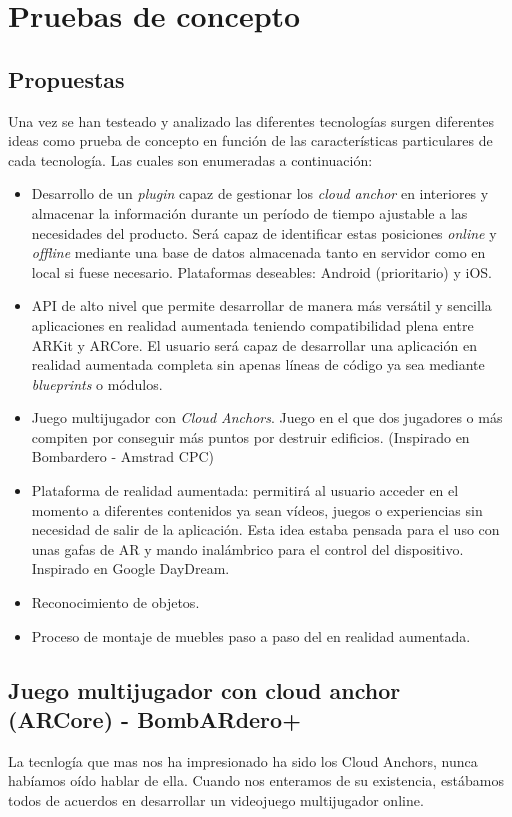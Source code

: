 \chapter{Pruebas de concepto}
\section{Propuestas}
Una vez se han testeado y analizado las diferentes tecnologías surgen diferentes ideas como prueba de concepto en función de las características particulares de cada tecnología. Las cuales son enumeradas a continuación:

\begin{itemize}
\item Desarrollo de un \textit{plugin} capaz de gestionar los \textit{cloud anchor} en interiores y almacenar la información durante un período de tiempo ajustable a las necesidades del producto. Será capaz de identificar estas posiciones \textit{online} y \textit{offline} mediante una base de datos almacenada tanto en servidor como en local si fuese necesario. Plataformas deseables: Android (prioritario) y iOS. 
\item API de alto nivel que permite desarrollar de manera más versátil y sencilla aplicaciones en realidad aumentada teniendo compatibilidad plena entre ARKit y ARCore. El usuario será capaz de desarrollar una aplicación en realidad aumentada completa sin apenas líneas de código ya sea mediante \textit{blueprints} o módulos.
\item Juego multijugador con \textit{Cloud Anchors}. Juego en el que dos jugadores o más compiten por conseguir más puntos por destruir edificios. (Inspirado en Bombardero - Amstrad CPC)
\item Plataforma de realidad aumentada: permitirá al usuario acceder en el momento a diferentes contenidos ya sean vídeos, juegos o experiencias sin necesidad de salir de la aplicación. Esta idea estaba pensada para el uso con unas gafas de AR y mando inalámbrico para el control del dispositivo. Inspirado en Google DayDream.
\item Reconocimiento de objetos.
\item Proceso de montaje de muebles paso a paso del en realidad aumentada.
\end{itemize}

\clearpage
\section{Juego multijugador con cloud anchor (ARCore) - BombARdero+}
La tecnlogía que mas nos ha impresionado ha sido los Cloud Anchors, nunca habíamos oído hablar de ella. Cuando nos enteramos de su existencia, estábamos todos de acuerdos en desarrollar un videojuego multijugador online.\\


